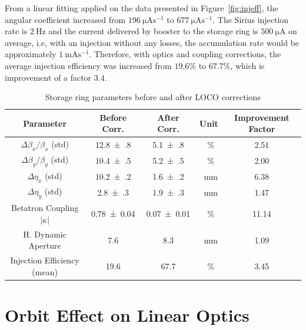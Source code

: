 From a linear fitting applied on the data presented in Figure~\ref{fig:injeff}, the angular coefficient increased from $\SI{196}{\micro\ampere\second^{-1}}$ to $\SI{677}{\micro\ampere\second^{-1}}$. The Sirius injection rate is $\SI{2}{\hertz}$ and the current delivered by booster to the storage ring is $\SI{500}{\micro\ampere}$ on average, i.e, with an injection without any losses, the accumulation rate would be approximately $\SI{1}{\milli\ampere\second^{-1}}$. Therefore, with optics and coupling corrections, the average injection efficiency was increased from $19.6\%$ to $67.7\%$, which is improvement of a factor $3.4$.

\begin{table}[h!]
    \centering
    \caption{Storage ring parameters before and after LOCO corrections}
    \label{tab:params_corr}
    \begin{tabular}{ccccc}
        \toprule\toprule
        Parameter & Before Corr. & After Corr. & Unit & Improvement Factor\\
        \hline
        $\Delta\beta_x/\beta_x$ (std) & \num{12.8(8)} & \num{5.1(8)} & \SI{}{\%} & \num{2.51} \\
        $\Delta\beta_y/\beta_y$ (std) & \num{10.4(5)} & \num{5.2(5)} & \SI{}{\%} & \num{2.00} \\
        $\Delta\eta_x$ (std) &  \num{10.2(2)} &  \num{1.6(2)} & \SI{}{\milli\meter} & \num{6.38} \\
        $\Delta\eta_y$ (std) &  \num{2.8(3)} &  \num{1.9(3)} & \SI{}{\milli\meter}& \num{1.47} \\
        Betatron Coupling $|\kappa|$ &  \num{0.78(4)} & \num{0.07(1)} & \SI{}{\%} & \num{11.14} \\
        H. Dynamic Aperture  & \num{7.6} & \num{8.3} & \SI{}{\milli\meter} & \num{1.09} \\
        Injection Efficiency (mean)  & \num{19.6} & \num{67.7} & \SI{}{\%} & \num{3.45} \\
        \bottomrule\bottomrule
    \end{tabular}
\end{table}

\section{Orbit Effect on Linear Optics}
